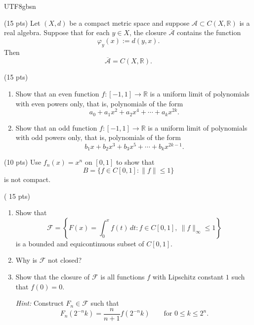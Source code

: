 \documentclass[addpoints]{exam}
\theoremstyle{definition}
\begin{document}
\begin{CJK*}{UTF8}{gbsn}
\begin{questions}
\question (15 pts)
Let \((X,d)\) be a compact metric space and suppose
\(\mathcal{A}\subset C(X,\mathbb{R})\) is a real algebra. Suppose that for each
\(y\in X\), the closure \(\overline{\mathcal{A}}\) contains the function
\[
\varphi_y(x):=d(y,x).
\]
Then
\[
\overline{\mathcal{A}}=C(X,\mathbb{R}).
\]

\begin{solution}


\end{solution}

\question (15 pts)

\begin{enumerate}
\item[(a)] Show that an even function \(f:[-1,1]\to\mathbb{R}\) is a uniform
limit of polynomials with even powers only, that is, polynomials of the form
\[
a_0+a_1x^2+a_2x^4+\cdots+a_kx^{2k}.
\]

\item[(b)] Show that an odd function \(f:[-1,1]\to\mathbb{R}\) is a uniform
limit of polynomials with odd powers only, that is, polynomials of the form
\[
b_1x+b_2x^3+b_3x^5+\cdots+b_kx^{2k-1}.
\]
\end{enumerate}

\begin{solution}


\end{solution}



\question (10 pts)
Use \(f_n(x)=x^n\) on \([0,1]\) to show that
\[
B=\{f\in C[0,1]:\|f\|\le 1\}
\]
is not compact.


\begin{solution} 
\end{solution}

\question ( 15 pts) 
\begin{enumerate}
\item[(a)] Show that
\[
\mathcal{F}
=
\left\{
F(x)=\int_0^x f(t)\,dt:
f\in C[0,1],\ \|f\|_\infty\le 1
\right\}
\]
is a bounded and equicontinuous subset of \(C[0,1]\).

\item[(b)] Why is \(\mathcal{F}\) not closed?

\item[(c)] Show that the closure of \(\mathcal{F}\) is all functions \(f\) with
Lipschitz constant \(1\) such that \(f(0)=0\).

\emph{Hint:} Construct \(F_n\in\mathcal{F}\) such that
\[
F_n(2^{-n}k)
=
\frac{n}{n+1}f(2^{-n}k)
\qquad
\text{for }0\le k\le 2^n.
\]
\end{enumerate}





\end{questions}
\end{CJK*}
\end{document}
